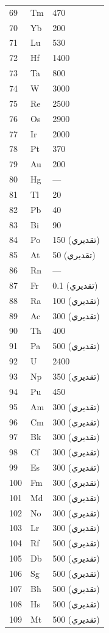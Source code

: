\documentclass[11pt,a4paper]{article}
\begin{document}
\begin{otherlanguage}{arabic}
\begin{longtable}{p{0.6cm}p{1.2cm}p{2.5cm}}
			69 & Tm & 470 \\
			70 & Yb & 200 \\
			71 & Lu & 530 \\
			72 & Hf & 1400 \\
			73 & Ta & 800 \\
			74 & W  & 3000 \\
			75 & Re & 2500 \\
			76 & Os & 2900 \\
			77 & Ir & 2000 \\
			78 & Pt & 370 \\
			79 & Au & 200 \\
			80 & Hg & — \\
			81 & Tl & 20 \\
			82 & Pb & 40 \\
			83 & Bi & 90 \\
			84 & Po & 150 (تقديري) \\
			85 & At & 50 (تقديري) \\
			86 & Rn & — \\
			87 & Fr & 0.1 (تقديري) \\
			88 & Ra & 100 (تقديري) \\
			89 & Ac & 300 (تقديري) \\
			90 & Th & 400 \\
			91 & Pa & 500 (تقديري) \\
			92 & U  & 2400 \\
			93 & Np & 350 (تقديري) \\
			94 & Pu & 450 \\
			95 & Am & 300 (تقديري) \\
			96 & Cm & 300 (تقديري) \\
			97 & Bk & 300 (تقديري) \\
			98 & Cf & 300 (تقديري) \\
			99 & Es & 300 (تقديري) \\
			100& Fm & 300 (تقديري) \\
			101& Md & 300 (تقديري) \\
			102& No & 300 (تقديري) \\
			103& Lr & 300 (تقديري) \\
			104& Rf & 500 (تقديري) \\
			105& Db & 500 (تقديري) \\
			106& Sg & 500 (تقديري) \\
			107& Bh & 500 (تقديري) \\
			108& Hs & 500 (تقديري) \\
			109& Mt & 500 (تقديري) \\

\end{longtable}
\end{otherlanguage}
\end{document}
